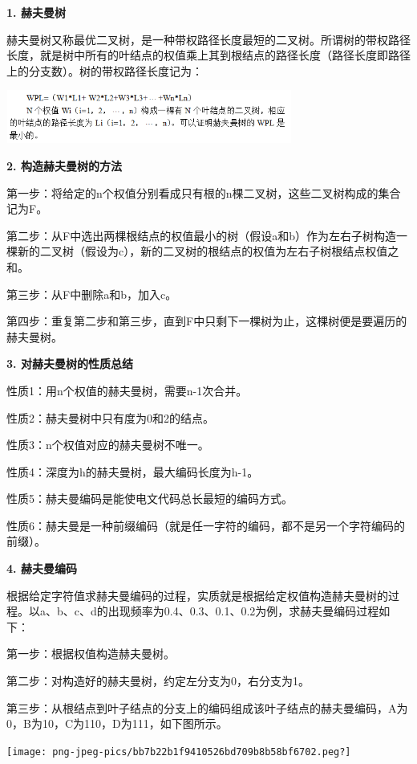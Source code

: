 {\textbf{1. 赫夫曼树}}

{{赫夫曼树又称最优二叉树，是一种带权路径长度最短的二叉树}。所谓树的带权路径长度，就是树中所有的叶结点的权值乘上其到根结点的路径长度（路径长度即路径上的分支数）。树的带权路径长度记为：}

\includegraphics[width=3.70833in,height=0.68750in]{png-jpeg-pics/55D22CD2B0D12A01E2475DA33D5F35E2.png}

{\textbf{2. 构造赫夫曼树的方法}}

{{第一步：}将给定的n个权值分别看成只有根的n棵二叉树，这些二叉树构成的集合记为F。}

{{第二步：}从F中选出两棵根结点的权值最小的树（假设a和b）作为左右子树构造一棵新的二叉树（假设为c），新的二叉树的根结点的权值为左右子树根结点权值之和。}

{{第三步：}从F中删除a和b，加入c。}

{{第四步：}重复第二步和第三步，直到F中只剩下一棵树为止，这棵树便是要遍历的赫夫曼树。}

{\textbf{3. 对赫夫曼树的性质总结}}

{{性质1：}用n个权值的赫夫曼树，需要n-1次合并。}

{{性质2：}赫夫曼树中只有度为0和2的结点。}

{{性质3：}n个权值对应的赫夫曼树不唯一。}

{{性质4：}{深度为h的赫夫曼树，最大编码长度为h-1。}}

{{性质5：}{赫夫曼编码是能使电文代码总长最短的编码方式。}}

{{{性质6：}赫夫曼是一种前缀编码（就是任一字符的编码，都不是另一个字符编码的前缀）。}}

{\textbf{4. 赫夫曼编码}}

{根据给定字符值求赫夫曼编码的过程，实质就是根据给定权值构造赫夫曼树的过程。以a、b、c、d的出现频率为0.4、0.3、0.1、0.2为例，求赫夫曼编码过程如下：}

{{第一步：}根据权值构造赫夫曼树。}

{{第二步：}对构造好的赫夫曼树，约定左分支为0，右分支为1。}

{{第三步：}从根结点到叶子结点的分支上的编码组成该叶子结点的赫夫曼编码，A为0，B为10，C为110，D为111，如下图所示。}

{\texttt{[image: png-jpeg-pics/bb7b22b1f9410526bd709b8b58bf6702.peg?]}}
